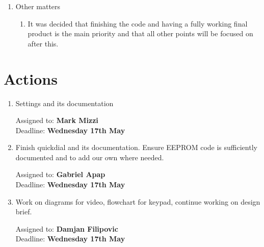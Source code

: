 \documentclass[11pt,a4paper]{scrartcl}
\begin{document}
\begin{enumerate}
\item Other matters
\begin{enumerate}
    \item It was decided that finishing the code and having a fully working final product is the main priority and that all other points will be focused on after this. 
\end{enumerate}

\end{enumerate}

\section*{Actions}

\begin{enumerate}

\item Settings and its documentation
\begin{flushright}
Assigned to: \textbf{Mark Mizzi} \\
Deadline: \textbf{Wednesday 17th May}
\end{flushright}

\item Finish quickdial and its documentation. Ensure EEPROM code is sufficiently documented and to add our own where needed.
\begin{flushright}
Assigned to: \textbf{Gabriel Apap} \\
Deadline: \textbf{Wednesday 17th May}
\end{flushright}

\item Work on diagrams for video, flowchart for keypad, continue working on design brief.
\begin{flushright}
Assigned to: \textbf{Damjan Filipovic} \\
Deadline: \textbf{Wednesday 17th May}
\end{flushright}


\end{enumerate}
\end{document}
